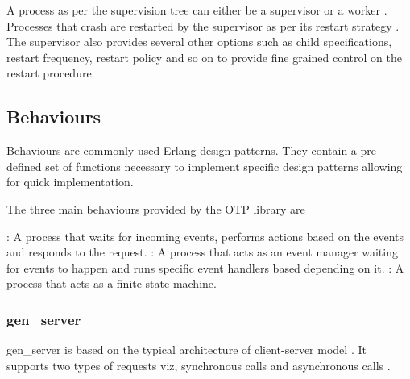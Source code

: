 A process as per the supervision tree can either be a supervisor%
or a worker%
. Processes that crash are restarted by the supervisor as per its
restart strategy%
. The supervisor also provides several other options such as child
specifications, restart frequency, restart policy and so on to provide
fine grained control on the restart procedure.

\subsection{Behaviours}
\label{section:concepts.behaviours}
Behaviours are commonly used Erlang design patterns. They contain a pre-defined
set of functions necessary to implement specific design patterns allowing for
quick implementation.

The three main behaviours provided by the OTP library are

\begin{itemize}
    : A process that waits for incoming events, performs
    actions based on the events and responds to the request.
    : A process that acts as an event manager waiting for
    events to happen and runs specific event handlers based depending on it.
    : A process that acts as a finite state machine.
\end{itemize}

\subsubsection{gen\_server}

gen\_server is based on the typical architecture of client-server model
\citep{reliable.dist.sys}. It supports two types of requests viz, synchronous
calls%
and asynchronous calls%
.

